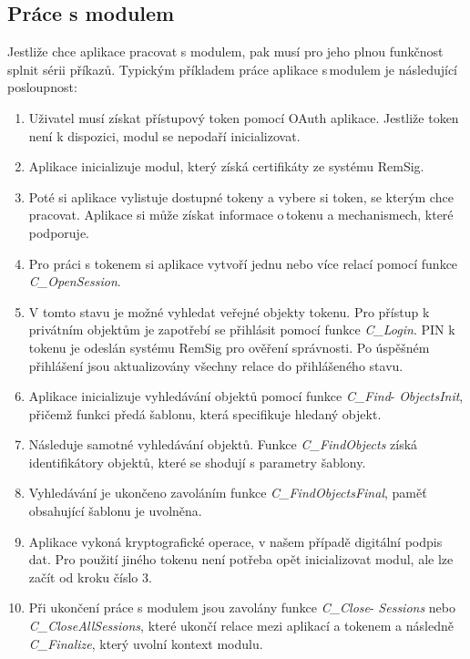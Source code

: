 \documentclass[]{fithesis3}
\begin{document}
	\subsection{Práce s modulem}
	
	Jestliže chce aplikace pracovat s modulem, pak musí pro jeho plnou funkčnost splnit sérii 			příkazů. Typickým příkladem práce aplikace s\,modulem je následující posloupnost:
	\begin{enumerate}
		\item Uživatel musí získat přístupový token pomocí OAuth aplikace. Jestliže token není k 			dispozici, modul se nepodaří inicializovat.
		\item Aplikace inicializuje modul, který získá certifikáty ze systému RemSig.
		\item Poté si aplikace vylistuje dostupné tokeny a vybere si token, se kterým chce 				pracovat. Aplikace si může získat informace o\,tokenu a mechanismech, které podporuje.
		\item Pro práci s tokenem si aplikace vytvoří jednu nebo více relací pomocí funkce 					\textit{C\_OpenSession}.
		\item V tomto stavu je možné vyhledat veřejné objekty tokenu. Pro přístup k privátním 			objektům je zapotřebí se přihlásit pomocí funkce \textit{C\_Login}. PIN k tokenu je 				odeslán systému RemSig pro ověření správnosti. Po úspěšném přihlášení jsou 					aktualizovány všechny relace do přihlášeného stavu.
		\item Aplikace inicializuje vyhledávání objektů pomocí funkce \textit{C\_Find}- \textit{ObjectsInit}, 			přičemž funkci předá šablonu, která specifikuje hledaný objekt. 
		\item Následuje samotné vyhledávání objektů. Funkce \textit{C\_FindObjects} získá 				identifikátory objektů, které se shodují s parametry šablony.
		\item Vyhledávání je ukončeno zavoláním funkce \textit{C\_FindObjectsFinal}, paměť 				obsahující šablonu je uvolněna.
		\item Aplikace vykoná kryptografické operace, v našem případě digitální podpis dat. Pro 			použití jiného tokenu není potřeba opět inicializovat modul, ale lze začít od kroku číslo 				3.
		\item Při ukončení práce s modulem jsou zavolány funkce \textit{C\_Close}- \textit{Sessions} nebo 		\textit{C\_CloseAllSessions}, které ukončí relace mezi aplikací a tokenem a následně 				\textit{C\_Finalize}, který uvolní kontext modulu.
	\end{enumerate}
\end{document}
